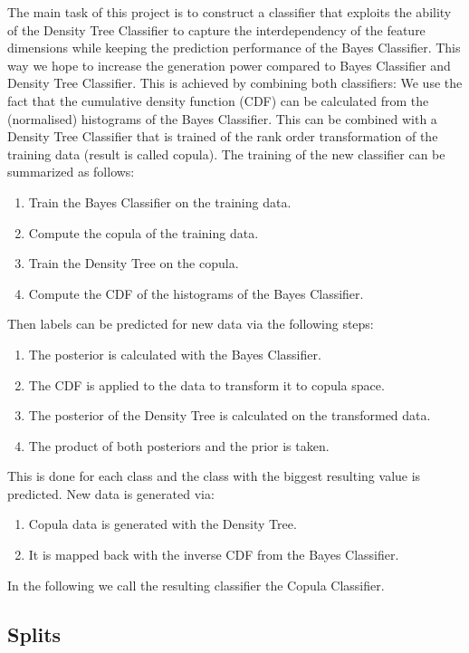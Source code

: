 \documentclass[draft]{article}
\begin{document}
The main task of this project is to construct a classifier that exploits the ability of the Density Tree Classifier to capture the 
interdependency of the feature dimensions while keeping the prediction performance of the Bayes Classifier.
This way we hope to increase the generation power compared to Bayes Classifier and Density Tree Classifier.
\newline
This is achieved by combining both classifiers: We use the fact that the cumulative density function (CDF)
can be calculated from the (normalised) histograms of the Bayes Classifier.
This can be combined with a Density Tree Classifier that is trained of the rank order transformation of
the training data (result is called copula).
\newline
The training of the new classifier can be summarized as follows:
\begin{enumerate}
\item Train the Bayes Classifier on the training data.
\item Compute the copula of the training data.
\item Train the Density Tree on the copula.
\item Compute the CDF of the histograms of the Bayes Classifier. 
\end{enumerate}
Then labels can be predicted for new data via the following steps:
\begin{enumerate}
\item The posterior is calculated with the Bayes Classifier. 
\item The CDF is applied to the data to transform it to copula space.
\item The posterior of the Density Tree is calculated on the transformed data.
\item The product of both posteriors and the prior is taken.
\end{enumerate}
This is done for each class and the class with the biggest resulting value is predicted.
\newline
New data is generated via:
\begin{enumerate}
\item Copula data is generated with the Density Tree.
\item It is mapped back with the inverse CDF from the Bayes Classifier.
\end{enumerate}
In the following we call the resulting classifier the Copula Classifier.

\subsection{Splits}
\end{document}
